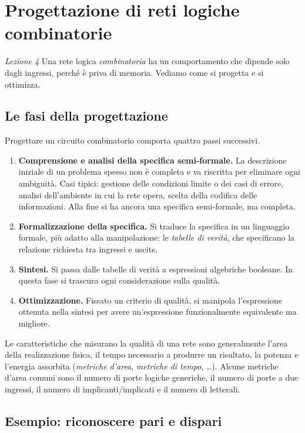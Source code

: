 \documentclass[11pt,a4paper]{article}
\begin{document}
\section[Progettazione di reti logiche combinatorie (Lezione 4)]{Progettazione di reti logiche combinatorie}
\noindent\emph{Lezione 4}
Una rete logica \emph{combinatoria} ha un comportamento che dipende solo dagli ingressi, perché è priva di memoria. Vediamo come si progetta e si ottimizza.

\subsection{Le fasi della progettazione}

Progettare un circuito combinatorio comporta quattro passi successivi.

\begin{enumerate}
    \item \textbf{Comprensione e analisi della specifica semi-formale.} La descrizione iniziale di un problema spesso non è completa e va riscritta per eliminare ogni ambiguità. Casi tipici: gestione delle condizioni limite o dei casi di errore, analisi dell'ambiente in cui la rete opera, scelta della codifica delle informazioni. Alla fine si ha ancora una specifica semi-formale, ma completa.
    \item \textbf{Formalizzazione della specifica.} Si traduce la specifica in un linguaggio formale, più adatto alla manipolazione: le \emph{tabelle di verità}, che specificano la relazione richiesta tra ingressi e uscite.
    \item \textbf{Sintesi.} Si passa dalle tabelle di verità a espressioni algebriche booleane. In questa fase si trascura ogni considerazione sulla qualità.
    \item \textbf{Ottimizzazione.} Fissato un criterio di qualità, si manipola l'espressione ottenuta nella sintesi per avere un'espressione funzionalmente equivalente ma migliore.
\end{enumerate}

Le caratteristiche che misurano la qualità di una rete sono generalmente l'area della realizzazione fisica, il tempo necessario a produrre un risultato, la potenza e l'energia assorbita (\emph{metriche d'area}, \emph{metriche di tempo}, \dots). Alcune metriche d'area comuni sono il numero di porte logiche generiche, il numero di porte a due ingressi, il numero di implicanti/implicati e il numero di letterali.

\subsection{Esempio: riconoscere pari e dispari}
\end{document}

